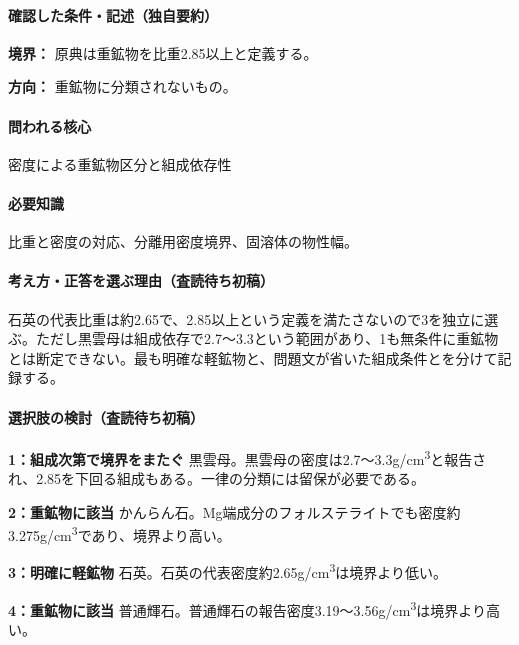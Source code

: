 \paragraph{確認した条件・記述（独自要約）}\mbox{}\par

\noindent\textbf{境界：} 原典は重鉱物を比重2.85以上と定義する。\par

\noindent\textbf{方向：} 重鉱物に分類されないもの。\par

\paragraph{問われる核心} 密度による重鉱物区分と組成依存性

\paragraph{必要知識} 比重と密度の対応、分離用密度境界、固溶体の物性幅。

\paragraph{考え方・正答を選ぶ理由（査読待ち初稿）} 石英の代表比重は約2.65で、2.85以上という定義を満たさないので3を独立に選ぶ。ただし黒雲母は組成依存で2.7〜3.3という範囲があり、1も無条件に重鉱物とは断定できない。最も明確な軽鉱物と、問題文が省いた組成条件とを分けて記録する。

\paragraph{選択肢の検討（査読待ち初稿）}\mbox{}\par

\noindent\textbf{1：組成次第で境界をまたぐ} 黒雲母。黒雲母の密度は2.7〜3.3g/cm\textsuperscript{3}と報告され、2.85を下回る組成もある。一律の分類には留保が必要である。\par

\noindent\textbf{2：重鉱物に該当} かんらん石。Mg端成分のフォルステライトでも密度約3.275g/cm\textsuperscript{3}であり、境界より高い。\par

\noindent\textbf{3：明確に軽鉱物} 石英。石英の代表密度約2.65g/cm\textsuperscript{3}は境界より低い。\par

\noindent\textbf{4：重鉱物に該当} 普通輝石。普通輝石の報告密度3.19〜3.56g/cm\textsuperscript{3}は境界より高い。\par

